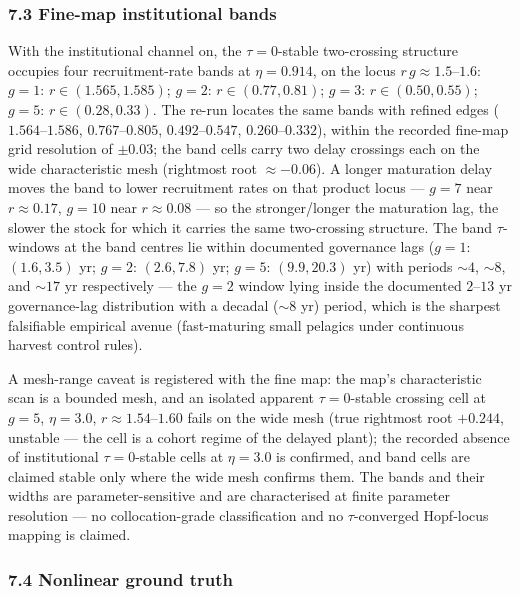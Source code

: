 \documentclass[11pt]{article}
\begin{document}
\subsubsection{7.3 Fine-map institutional
bands}\label{fine-map-institutional-bands}

With the institutional channel on, the \(\tau = 0\)-stable two-crossing
structure occupies four recruitment-rate bands at \(\eta = 0.914\), on
the locus \(r\,g \approx 1.5\)--\(1.6\): \(g = 1\):
\(r \in (1.565, 1.585)\); \(g = 2\): \(r \in (0.77, 0.81)\); \(g = 3\):
\(r \in (0.50, 0.55)\); \(g = 5\): \(r \in (0.28, 0.33)\). The re-run
locates the same bands with refined edges (\(1.564\)--\(1.586\),
\(0.767\)--\(0.805\), \(0.492\)--\(0.547\), \(0.260\)--\(0.332\)),
within the recorded fine-map grid resolution of \(\pm 0.03\); the band
cells carry two delay crossings each on the wide characteristic mesh
(rightmost root \(\approx -0.06\)). A longer maturation delay moves the
band to lower recruitment rates on that product locus --- \(g=7\) near
\(r\approx0.17\), \(g=10\) near \(r\approx0.08\) --- so the
stronger/longer the maturation lag, the slower the stock for which it
carries the same two-crossing structure. The band \(\tau\)-windows at
the band centres lie within documented governance lags (\(g=1\):
\((1.6,3.5)\) yr; \(g=2\): \((2.6,7.8)\) yr; \(g=5\): \((9.9,20.3)\) yr)
with periods \(\sim4\), \(\sim8\), and \(\sim17\) yr respectively ---
the \(g=2\) window lying inside the documented \(2\)--\(13\) yr
governance-lag distribution with a decadal (\(\sim8\) yr) period, which
is the sharpest falsifiable empirical avenue (fast-maturing small
pelagics under continuous harvest control rules).

A mesh-range caveat is registered with the fine map: the map's
characteristic scan is a bounded mesh, and an isolated apparent
\(\tau = 0\)-stable crossing cell at \(g = 5\), \(\eta = 3.0\),
\(r \approx 1.54\)--\(1.60\) fails on the wide mesh (true rightmost root
\(+0.244\), unstable --- the cell is a cohort regime of the delayed
plant); the recorded absence of institutional \(\tau = 0\)-stable cells
at \(\eta = 3.0\) is confirmed, and band cells are claimed stable only
where the wide mesh confirms them. The bands and their widths are
parameter-sensitive and are characterised at finite parameter resolution
--- no collocation-grade classification and no \(\tau\)-converged
Hopf-locus mapping is claimed.

\subsubsection{7.4 Nonlinear ground truth}\label{nonlinear-ground-truth}
\end{document}
